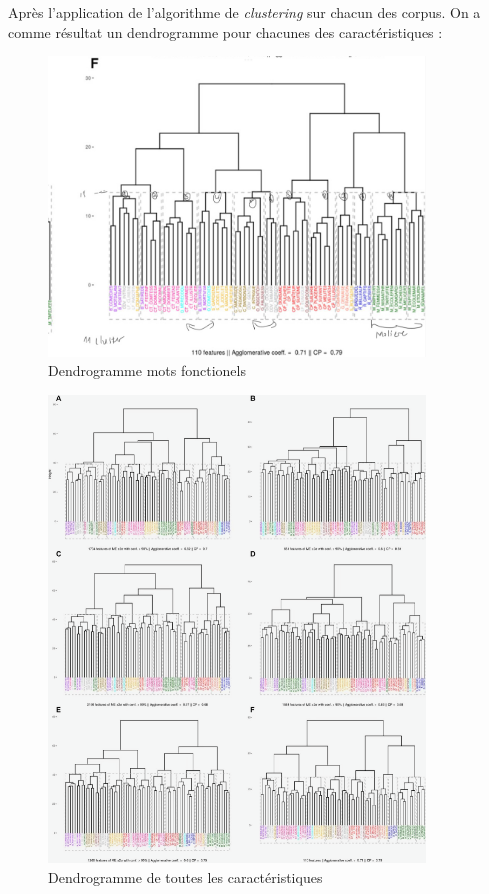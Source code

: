 \vspace{\baselineskip}
Après l’application de l’algorithme de \textit{clustering} sur chacun des
corpus. On a comme résultat un dendrogramme pour chacunes des caractéristiques :

\begin{figure}[htbp]
    \centering
    \includegraphics[width=10cm]{Ressources/IMG_0552.png}
    \caption{Dendrogramme mots fonctionels}
    \label{fig:images}
  \end{figure}
  \vspace{\baselineskip}

  \begin{figure}[htbp]
    \centering
    \includegraphics[width=10cm]{Ressources/Fig. 1 JPEG-1.png}
    \caption{Dendrogramme de toutes les caractéristiques}
    \label{fig:images}
  \end{figure}
  

